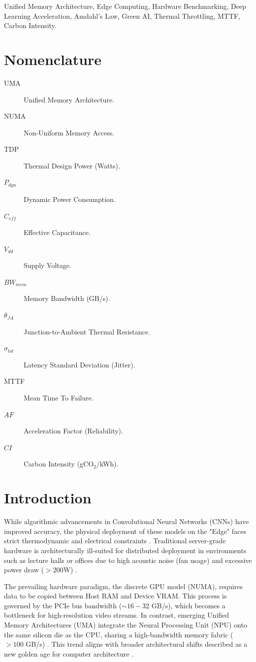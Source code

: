 \documentclass[conference]{IEEEtran}
\begin{document}
\begin{IEEEkeywords}
Unified Memory Architecture, Edge Computing, Hardware Benchmarking, Deep Learning Acceleration, Amdahl's Law, Green AI, Thermal Throttling, MTTF, Carbon Intensity.
\end{IEEEkeywords}

\section*{Nomenclature}
\begin{description}
    \item[UMA] Unified Memory Architecture.
    \item[NUMA] Non-Uniform Memory Access.
    \item[TDP] Thermal Design Power (Watts).
    \item[$P_{dyn}$] Dynamic Power Consumption.
    \item[$C_{eff}$] Effective Capacitance.
    \item[$V_{dd}$] Supply Voltage.
    \item[$BW_{mem}$] Memory Bandwidth (GB/s).
    \item[$\theta_{JA}$] Junction-to-Ambient Thermal Resistance.
    \item[$\sigma_{lat}$] Latency Standard Deviation (Jitter).
    \item[MTTF] Mean Time To Failure.
    \item[$AF$] Acceleration Factor (Reliability).
    \item[$CI$] Carbon Intensity (gCO$_2$/kWh).
\end{description}

\section{Introduction}
While algorithmic advancements in Convolutional Neural Networks (CNNs) have improved accuracy, the physical deployment of these models on the "Edge" faces strict thermodynamic and electrical constraints \cite{b15}. Traditional server-grade hardware is architecturally ill-suited for distributed deployment in environments such as lecture halls or offices due to high acoustic noise (fan usage) and excessive power draw ($>200$W) \cite{b5}.

The prevailing hardware paradigm, the discrete GPU model (NUMA), requires data to be copied between Host RAM and Device VRAM. This process is governed by the PCIe bus bandwidth ($\sim 16-32$ GB/s), which becomes a bottleneck for high-resolution video streams. In contrast, emerging Unified Memory Architectures (UMA) integrate the Neural Processing Unit (NPU) onto the same silicon die as the CPU, sharing a high-bandwidth memory fabric ($>100$ GB/s) \cite{b16, b11}. This trend aligns with broader architectural shifts described as a new golden age for computer architecture \cite{b29}.
\end{document}
